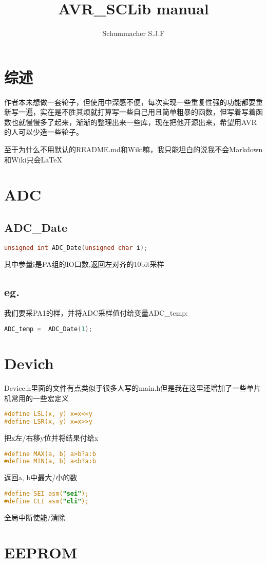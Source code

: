 \documentclass{article}
\title{AVR\_SCLib manual}
\begin{document}
\author{Schummacher S.J.F}
\maketitle
\newpage
\tableofcontents
\newpage
\section{综述}
作者本未想做一套轮子，但使用中深感不便，每次实现一些重复性强的功能都要重新写一遍，实在是不胜其烦就打算写一些自己用且简单粗暴的函数，但写着写着函数也就慢慢多了起来，渐渐的整理出来一些库，现在把他开源出来，希望用AVR的人可以少造一些轮子。\par
至于为什么不用默认的README.md和Wiki嘛，我只能坦白的说我不会Markdown和Wiki只会\LaTeX
\section{ADC}
\subsection{ADC\_Date}
\begin{lstlisting}[language=C]
unsigned int ADC_Date(unsigned char i);
\end{lstlisting}
其中参量i是PA组的IO口数,返回左对齐的10bit采样
\subsection{eg.}
我们要采PA1的样，并将ADC采样值付给变量ADC\_temp:
\begin{lstlisting}[language=C]
ADC_temp =  ADC_Date(1);
\end{lstlisting}
\section{Devich}
Device.h里面的文件有点类似于很多人写的main.h但是我在这里还增加了一些单片机常用的一些宏定义
\begin{lstlisting}[language=C]
#define LSL(x, y) x=x<<y
#define LSR(x, y) x=x>>y
\end{lstlisting}
把x左/右移y位并将结果付给x
\begin{lstlisting}[language=C]
#define MAX(a, b) a>b?a:b
#define MIN(a, b) a<b?a:b
\end{lstlisting}
返回a, b中最大/小的数
\begin{lstlisting}[language=C]
#define SEI asm("sei");
#define CLI asm("cli");
\end{lstlisting}
全局中断使能/清除
\section{EEPROM}
\end{document}
